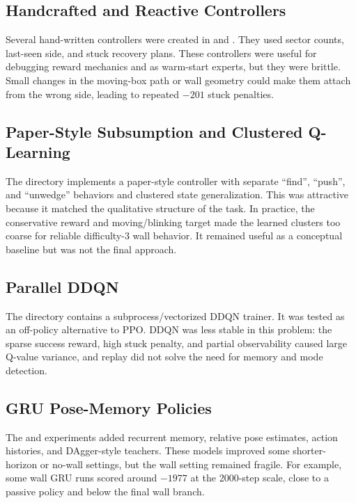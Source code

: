 \documentclass[11pt]{article}
\begin{document}
\subsection{Handcrafted and Reactive Controllers}

Several hand-written controllers were created in  and .
They used sector counts, last-seen side, and stuck recovery plans.  These controllers
were useful for debugging reward mechanics and as warm-start experts, but they were
brittle.  Small changes in the moving-box path or wall geometry could make them attach
from the wrong side, leading to repeated \(-201\) stuck penalties.

\subsection{Paper-Style Subsumption and Clustered Q-Learning}

The  directory implements a paper-style controller with separate
``find'', ``push'', and ``unwedge'' behaviors and clustered state generalization.
This was attractive because it matched the qualitative structure of the task.  In
practice, the conservative reward and moving/blinking target made the learned clusters
too coarse for reliable difficulty-3 wall behavior.  It remained useful as a conceptual
baseline but was not the final approach.

\subsection{Parallel DDQN}

The  directory contains a subprocess/vectorized DDQN trainer.  It
was tested as an off-policy alternative to PPO.  DDQN was less stable in this problem:
the sparse success reward, high stuck penalty, and partial observability caused large
Q-value variance, and replay did not solve the need for memory and mode detection.

\subsection{GRU Pose-Memory Policies}

The  and  experiments added recurrent memory, relative
pose estimates, action histories, and DAgger-style teachers.  These models improved
some shorter-horizon or no-wall settings, but the wall setting remained fragile.  For
example, some wall GRU runs scored around \(-1977\) at the 2000-step scale, close to a
passive policy and below the final wall branch.
\end{document}
